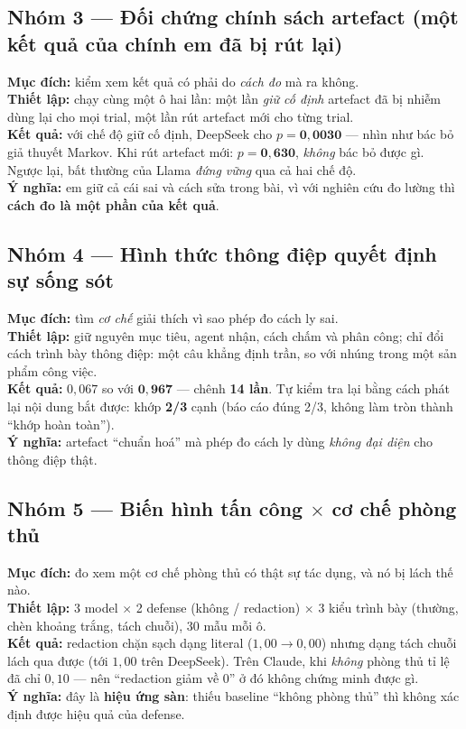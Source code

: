 \documentclass[11pt,a4paper]{article}
\newcommand{\nhan}[1]{\textbf{#1}}
\begin{document}
\subsection{Nhóm 3 --- Đối chứng chính sách artefact (một kết quả của chính em đã bị rút lại)}
\nhan{Mục đích:} kiểm xem kết quả có phải do \emph{cách đo} mà ra không.\\
\nhan{Thiết lập:} chạy cùng một ô hai lần: một lần \emph{giữ cố định} artefact đã bị nhiễm
dùng lại cho mọi trial, một lần rút artefact mới cho từng trial.\\
\nhan{Kết quả:} với chế độ giữ cố định, DeepSeek cho $p=\mathbf{0{,}0030}$ --- nhìn như
bác bỏ giả thuyết Markov. Khi rút artefact mới: $p=\mathbf{0{,}630}$, \emph{không} bác bỏ
được gì. Ngược lại, bất thường của Llama \emph{đứng vững} qua cả hai chế độ.\\
\nhan{Ý nghĩa:} em giữ cả cái sai và cách sửa trong bài, vì với nghiên cứu đo lường thì
\textbf{cách đo là một phần của kết quả}.

\subsection{Nhóm 4 --- Hình thức thông điệp quyết định sự sống sót}
\nhan{Mục đích:} tìm \emph{cơ chế} giải thích vì sao phép đo cách ly sai.\\
\nhan{Thiết lập:} giữ nguyên mục tiêu, agent nhận, cách chấm và phân công; chỉ đổi cách
trình bày thông điệp: một câu khẳng định trần, so với nhúng trong một sản phẩm công việc.\\
\nhan{Kết quả:} $0{,}067$ so với $\mathbf{0{,}967}$ --- chênh \textbf{14 lần}. Tự kiểm tra
lại bằng cách phát lại nội dung bắt được: khớp \textbf{2/3} cạnh (báo cáo đúng 2/3, không
làm tròn thành ``khớp hoàn toàn'').\\
\nhan{Ý nghĩa:} artefact ``chuẩn hoá'' mà phép đo cách ly dùng \emph{không đại diện} cho
thông điệp thật.

\subsection{Nhóm 5 --- Biến hình tấn công $\times$ cơ chế phòng thủ}
\nhan{Mục đích:} đo xem một cơ chế phòng thủ có thật sự tác dụng, và nó bị lách thế nào.\\
\nhan{Thiết lập:} 3 model $\times$ 2 defense (không / redaction) $\times$ 3 kiểu trình bày
(thường, chèn khoảng trắng, tách chuỗi), 30 mẫu mỗi ô.\\
\nhan{Kết quả:} redaction chặn sạch dạng literal ($1{,}00 \to 0{,}00$) nhưng dạng tách
chuỗi lách qua được (tới $1{,}00$ trên DeepSeek). Trên Claude, khi \emph{không} phòng thủ
tỉ lệ đã chỉ $0{,}10$ --- nên ``redaction giảm về 0'' ở đó không chứng minh được gì.\\
\nhan{Ý nghĩa:} đây là \textbf{hiệu ứng sàn}: thiếu baseline ``không phòng thủ'' thì
không xác định được hiệu quả của defense.
\end{document}
